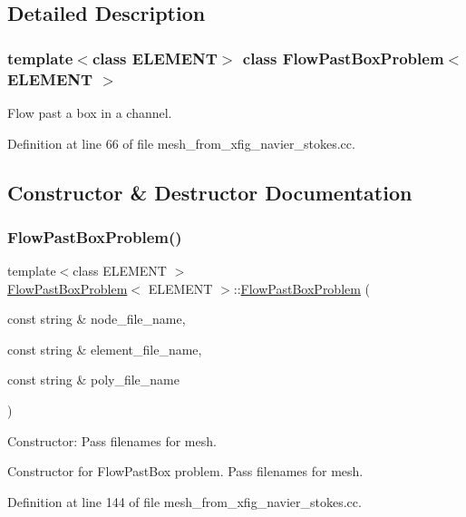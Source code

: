 \subsection{Detailed Description}
\subsubsection*{template$<$class E\+L\+E\+M\+E\+NT$>$\newline
class Flow\+Past\+Box\+Problem$<$ E\+L\+E\+M\+E\+N\+T $>$}

Flow past a box in a channel. 

Definition at line 66 of file mesh\+\_\+from\+\_\+xfig\+\_\+navier\+\_\+stokes.\+cc.



\subsection{Constructor \& Destructor Documentation}
\mbox{\label{classFlowPastBoxProblem_a6b674c1028abcd6e54c50d939d25a00e}} 
\subsubsection{\texorpdfstring{Flow\+Past\+Box\+Problem()}{FlowPastBoxProblem()}}
{\footnotesize\ttfamily template$<$class E\+L\+E\+M\+E\+NT $>$ \\
\hyperlink{classFlowPastBoxProblem}{Flow\+Past\+Box\+Problem}$<$ E\+L\+E\+M\+E\+NT $>$\+::\hyperlink{classFlowPastBoxProblem}{Flow\+Past\+Box\+Problem} (\begin{DoxyParamCaption}\item[{const string \&}]{node\+\_\+file\+\_\+name,  }\item[{const string \&}]{element\+\_\+file\+\_\+name,  }\item[{const string \&}]{poly\+\_\+file\+\_\+name }\end{DoxyParamCaption})}



Constructor\+: Pass filenames for mesh. 

Constructor for Flow\+Past\+Box problem. Pass filenames for mesh. 

Definition at line 144 of file mesh\+\_\+from\+\_\+xfig\+\_\+navier\+\_\+stokes.\+cc.



